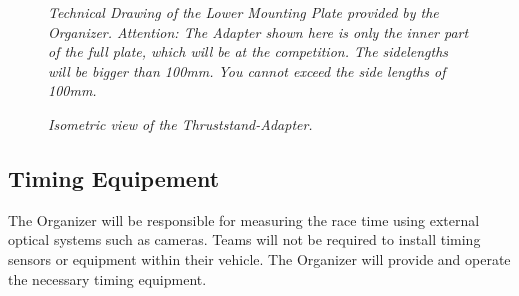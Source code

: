 \documentclass{article}
\begin{document}
\begin{figure}
  \centering
\caption{\textit{Technical Drawing of the Lower Mounting Plate provided by the Organizer. Attention: The Adapter shown here is only the inner part of the full plate, which will be at the competition. The sidelengths will be bigger than 100mm. You cannot exceed the side lengths of 100mm.}}
\end{figure}

\begin{figure}[h!]
 \centering
\caption{\textit{Isometric view of the Thruststand-Adapter.}}
\end{figure}



\subsection{Timing Equipement}
The Organizer will be responsible for measuring the race time using external optical systems such as cameras. Teams will not be required to install timing sensors or equipment within their vehicle. The Organizer will provide and operate the necessary timing equipment.
\end{document}
